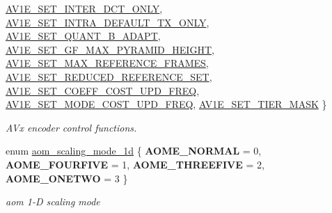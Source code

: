 \begin{DoxyCompactItemize}
\newline
\hyperlink{group__aom__encoder_ggae78dde67a6d78f332e9bdba0dde42db5ac3dcd39257d82c1be99a8752bef6f20b}{A\+V1\+E\+\_\+\+S\+E\+T\+\_\+\+I\+N\+T\+E\+R\+\_\+\+D\+C\+T\+\_\+\+O\+N\+LY}, 
\hyperlink{group__aom__encoder_ggae78dde67a6d78f332e9bdba0dde42db5a335eed63dd36dd6e9a83a462c3c15fe1}{A\+V1\+E\+\_\+\+S\+E\+T\+\_\+\+I\+N\+T\+R\+A\+\_\+\+D\+E\+F\+A\+U\+L\+T\+\_\+\+T\+X\+\_\+\+O\+N\+LY}, 
\hyperlink{group__aom__encoder_ggae78dde67a6d78f332e9bdba0dde42db5a953968db8a041da6fe727add815ad53e}{A\+V1\+E\+\_\+\+S\+E\+T\+\_\+\+Q\+U\+A\+N\+T\+\_\+\+B\+\_\+\+A\+D\+A\+PT}, 
\hyperlink{group__aom__encoder_ggae78dde67a6d78f332e9bdba0dde42db5a685f831a5a5d08f9b5a14209d55ac129}{A\+V1\+E\+\_\+\+S\+E\+T\+\_\+\+G\+F\+\_\+\+M\+A\+X\+\_\+\+P\+Y\+R\+A\+M\+I\+D\+\_\+\+H\+E\+I\+G\+HT}, 
\newline
\hyperlink{group__aom__encoder_ggae78dde67a6d78f332e9bdba0dde42db5adaa8c4b0f736003b552d1d7d68877f6f}{A\+V1\+E\+\_\+\+S\+E\+T\+\_\+\+M\+A\+X\+\_\+\+R\+E\+F\+E\+R\+E\+N\+C\+E\+\_\+\+F\+R\+A\+M\+ES}, 
\hyperlink{group__aom__encoder_ggae78dde67a6d78f332e9bdba0dde42db5a17fe8deb975a641c65d1dce6b5e3a4e0}{A\+V1\+E\+\_\+\+S\+E\+T\+\_\+\+R\+E\+D\+U\+C\+E\+D\+\_\+\+R\+E\+F\+E\+R\+E\+N\+C\+E\+\_\+\+S\+ET}, 
\hyperlink{group__aom__encoder_ggae78dde67a6d78f332e9bdba0dde42db5a542a607e7d8c6a3d8244136b3e09da4b}{A\+V1\+E\+\_\+\+S\+E\+T\+\_\+\+C\+O\+E\+F\+F\+\_\+\+C\+O\+S\+T\+\_\+\+U\+P\+D\+\_\+\+F\+R\+EQ}, 
\hyperlink{group__aom__encoder_ggae78dde67a6d78f332e9bdba0dde42db5afb9a186506424be1020cdd8c79342b7a}{A\+V1\+E\+\_\+\+S\+E\+T\+\_\+\+M\+O\+D\+E\+\_\+\+C\+O\+S\+T\+\_\+\+U\+P\+D\+\_\+\+F\+R\+EQ}, 
\newline
\hyperlink{group__aom__encoder_ggae78dde67a6d78f332e9bdba0dde42db5a8a9265ce765bdcf9df119a7e5c7b3cc7}{A\+V1\+E\+\_\+\+S\+E\+T\+\_\+\+T\+I\+E\+R\+\_\+\+M\+A\+SK}
 \}\begin{DoxyCompactList}\small\item\em A\+Vx encoder control functions. \end{DoxyCompactList}
\item 
enum \hyperlink{group__aom__encoder_ga2a1791d26fca39303154f0f9ece3e295}{aom\+\_\+scaling\+\_\+mode\+\_\+1d} \{ {\bfseries A\+O\+M\+E\+\_\+\+N\+O\+R\+M\+AL} = 0, 
{\bfseries A\+O\+M\+E\+\_\+\+F\+O\+U\+R\+F\+I\+VE} = 1, 
{\bfseries A\+O\+M\+E\+\_\+\+T\+H\+R\+E\+E\+F\+I\+VE} = 2, 
{\bfseries A\+O\+M\+E\+\_\+\+O\+N\+E\+T\+WO} = 3
 \}\begin{DoxyCompactList}\small\item\em aom 1-\/D scaling mode \end{DoxyCompactList}

\end{DoxyCompactItemize}

